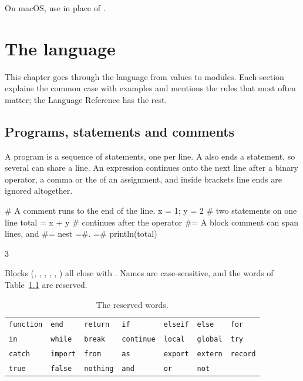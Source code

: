 \documentclass[11pt,a4paper,openany]{report}
\begin{document}
On macOS, use  in place of .

\chapter{The language}\label{ch:lang}

This chapter goes through the language from values to modules. Each section
explains the common case with examples and mentions the rules that most often
matter; the Language Reference has the rest.

\section{Programs, statements and comments}

A program is a sequence of statements, one per line. A \code{;} also ends a
statement, so several can share a line. An expression continues onto the next
line after a binary operator, a comma or the \code{=} of an assignment, and
inside brackets line ends are ignored altogether.

\begin{axon}
# A comment runs to the end of the line.
x = 1; y = 2          # two statements on one line
total = x +
        y             # continues after the operator
#= A block comment
   can span lines, and #= nest =#. =#
println(total)
\end{axon}
\begin{axonout}
3
\end{axonout}

Blocks (, , , , ,
) all close with . Names are case-sensitive, and the
words of Table~\ref{tab:keywords} are reserved.

\begin{table}[htbp]
\centering
\caption{The reserved words.}\label{tab:keywords}
\begin{tabular}{@{}*{7}{l}@{}}
\toprule
\texttt{function} & \texttt{end} & \texttt{return} & \texttt{if} & \texttt{elseif}
  & \texttt{else} & \texttt{for} \\
\texttt{in} & \texttt{while} & \texttt{break} & \texttt{continue} & \texttt{local}
  & \texttt{global} & \texttt{try} \\
\texttt{catch} & \texttt{import} & \texttt{from} & \texttt{as} & \texttt{export}
  & \texttt{extern} & \texttt{record} \\
\texttt{true} & \texttt{false} & \texttt{nothing} & \texttt{and} & \texttt{or}
  & \texttt{not} & \\
\bottomrule
\end{tabular}
\end{table}
\end{document}
